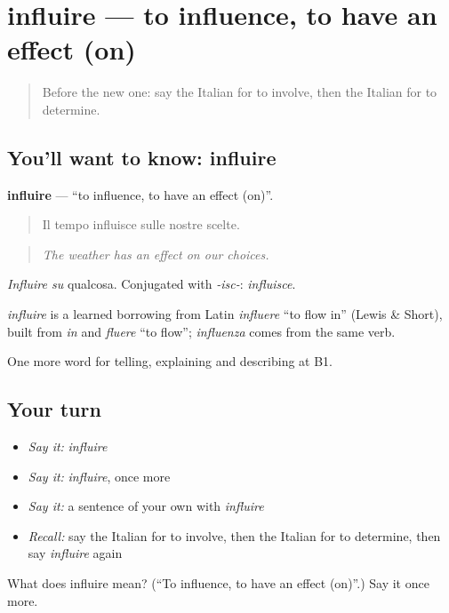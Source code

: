 \section[influire]{influire — to influence, to have an effect (on)}

\label{lesson:IT-C351-influire}



\begin{quote}
Before the new one: say the Italian for to involve, then the Italian for to determine.
\end{quote}

\subsection*{You'll want to know: influire}
\textbf{influire} — \textquotedblleft{}to influence, to have an effect (on)\textquotedblright{}.

\begin{quote}
Il tempo influisce sulle nostre scelte.
\end{quote}

\begin{quote}
\emph{The weather has an effect on our choices.}
\end{quote}

\emph{Influire su} qualcosa. Conjugated with \emph{-isc-}: \emph{influisce}.

\begin{cousinweb}
\emph{influire} is a learned borrowing from Latin \emph{influere} \textquotedblleft{}to flow in\textquotedblright{} (Lewis \& Short), built from \emph{in} and \emph{fluere} \textquotedblleft{}to flow\textquotedblright{}; \emph{influenza} comes from the same verb.
\end{cousinweb}

\begin{grammarlens}[title={What you've built}]
One more word for telling, explaining and describing at B1.
\end{grammarlens}

\subsection*{Your turn}
\begin{itemize}
\raggedright
  \item \emph{Say it:} \emph{influire}
  \item \emph{Say it:} \emph{influire}, once more
  \item \emph{Say it:} a sentence of your own with \emph{influire}
  \item \emph{Recall:} say the Italian for to involve, then the Italian for to determine, then say \emph{influire} again
\end{itemize}

\begin{tcolorbox}[breakable,colback=teal!4,colframe=teal!35!black,title={Before you move on}]
What does influire mean? (\textquotedblleft{}To influence, to have an effect (on)\textquotedblright{}.) Say it once more.
\end{tcolorbox}
